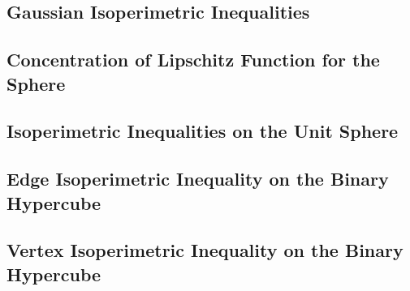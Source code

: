 \documentclass[11pt]{article}
\begin{document}
\subsection{Gaussian Isoperimetric Inequalities}
\subsection{Concentration of Lipschitz Function for the Sphere}
\subsection{Isoperimetric Inequalities on the Unit Sphere}
\subsection{Edge Isoperimetric Inequality on the Binary Hypercube}
\subsection{Vertex Isoperimetric Inequality on the Binary Hypercube}






\newpage


\end{document}
